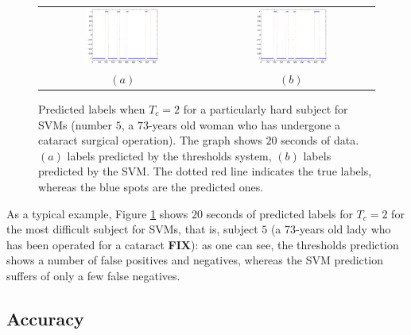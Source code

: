 \documentclass[a4paper,10pt,conference]{ieeeconf}
\begin{document}
\begin{figure}[!t]
  \begin{center}
    \begin{tabular}{cc}
      \includegraphics[width=0.45\textwidth]{predictionT.eps} &
      \includegraphics[width=0.45\textwidth]{predictionS.eps} \\
      $(a)$ & $(b)$
    \end{tabular}
    \caption{Predicted labels when $T_c=2$ for a particularly hard
    subject for SVMs (number $5$, a $73$-years old woman who has
    undergone a cataract surgical operation). The graph shows $20$
    seconds of data. $(a)$ labels predicted by the thresholds system,
    $(b)$ labels predicted by the SVM. The dotted red line indicates
    the true labels, whereas the blue spots are the predicted ones.}
    \label{fig:prediction}
  \end{center}
\end{figure}

As a typical example, Figure \ref{fig:prediction} shows $20$ seconds
of predicted labels for $T_c=2$ for the most difficult subject for
SVMs, that is, subject $5$ (a 73-years old lady who has been operated
for a cataract {\bf FIX}): as one can see, the thresholds prediction
shows a number of false positives and negatives, whereas the SVM
prediction suffers of only a few false negatives.

\subsection{Accuracy}
\label{subsec:accuracy}
\end{document}
